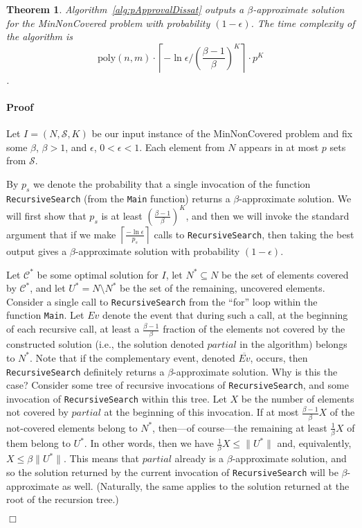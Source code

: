 \documentclass[11pt]{article}
\newcommand{\Ev}{{\mathit{Ev}}}
\newcommand{\partialsol}{{\mathit{partial}}}
\newcommand{\poly}{{\mathrm{poly}}}
\newtheorem{theorem}{Theorem}
\newenvironment{proof}{\paragraph{Proof}}{\hfill$\Box$\medskip}
\newcommand{\calC}{{{\mathcal{C}}}}
\newcommand{\calS}{{{\mathcal{S}}}}
\begin{document}
\begin{theorem}\label{thm:pApprovalDissat}
  Algorithm~\ref{alg:pApprovalDissat} outputs a $\beta$-approximate
  solution for the MinNonCovered problem with probability $(1 -
  \epsilon)$. The time complexity of the algorithm is \[\poly(n,m) \cdot
  \left\lceil -\ln \epsilon/\left(\frac{\beta - 1}{\beta}\right)^K
  \right\rceil \cdot p^{K}\].
\end{theorem}
\begin{proof}
  Let $I = (N,\calS,K)$ be our input instance of the MinNonCovered
  problem and fix some $\beta$, $\beta > 1$, and $\epsilon$, $0 <
  \epsilon < 1$. Each element from $N$ appears in at most $p$ sets
  from $\calS$.

  By $p_{s}$ we denote the probability that a single invocation of the
  function \texttt{RecursiveSearch} (from the \texttt{Main} function)
  returns a $\beta$-approximate solution.  We will first show that
  $p_s$ is at least $\left(\frac{\beta - 1}{\beta}\right)^K$, and then
  we will invoke the standard argument that if we make
  $\left\lceil\frac{-\ln\epsilon}{p_s}\right\rceil$ calls to
  \texttt{RecursiveSearch}, then taking the best output gives a
  $\beta$-approximate solution with probability $(1-\epsilon)$.

  


  Let $\calC^*$ be some optimal solution for $I$, let $N^* \subseteq
  N$ be the set of elements covered by $\calC^*$, and let $U^* = N
  \setminus N^*$ be the set of the remaining, uncovered elements.
Consider a single call to \texttt{RecursiveSearch} from the ``for''
  loop within the function \texttt{Main}.  Let $\Ev$ denote the event
  that during such a call, at the beginning of each recursive call, at
  least a $\frac{\beta-1}{\beta}$ fraction of the elements not covered
  by the constructed solution (i.e., the solution denoted
  $\partialsol$ in the algorithm) belongs to $N^*$.
Note that if the complementary event, denoted $\overline{\Ev}$,
  occurs, then \texttt{RecursiveSearch} definitely returns a
  $\beta$-approximate solution. Why is this the case? Consider some
  tree of recursive invocations of \texttt{RecursiveSearch}, and some
  invocation of \texttt{RecursiveSearch} within this tree. Let $X$ be
  the number of elements not covered by $\partialsol$ at the beginning
  of this invocation.  If at most $\frac{\beta-1}{\beta}X$ of the
  not-covered elements belong to $N^*$, then---of course---the
  remaining at least $\frac{1}{\beta}X$ of them belong to $U^*$. In
  other words, then we have $\frac{1}{\beta}X \leq \|U^*\|$ and,
  equivalently, $X \leq \beta\|U^*\|$. This means that $\partialsol$
  already is a $\beta$-approximate solution, and so the solution
  returned by the current invocation of \texttt{RecursiveSearch} will
  be $\beta$-approximate as well.  (Naturally, the same applies to the
  solution returned at the root of the recursion tree.)




\end{proof}
\end{document}
